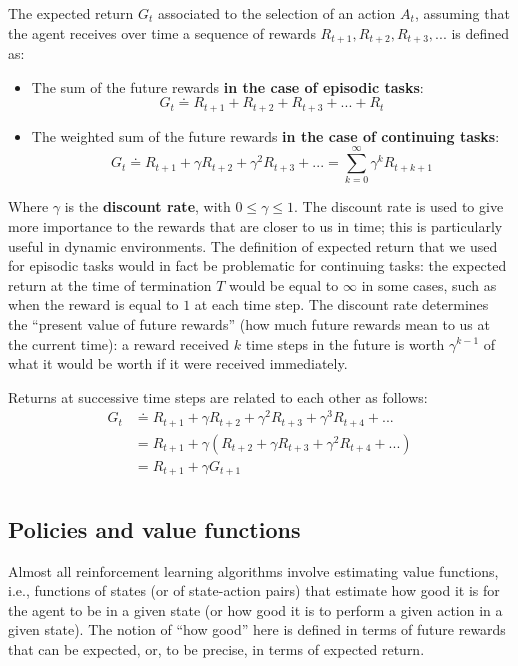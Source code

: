 The expected return $G_t$ associated to the selection of an action $A_t$, assuming that the agent receives over time a sequence of rewards $R_{t+1}, R_{t+2}, R_{t+3}, ...$ is defined as:
\begin{itemize}
    \item The sum of the future rewards \textbf{in the case of episodic tasks}:
    \begin{equation}
        G_t \doteq R_{t+1} + R_{t+2} + R_{t+3} + ... + R_t
        \label{eq:ch2-expectedreturn-episodic}
    \end{equation}
    \item The weighted sum of the future rewards \textbf{in the case of continuing tasks}:
    \begin{equation}
        G_t \doteq R_{t+1} + \gamma R_{t+2} + \gamma^2 R_{t+3} + ... = \sum_{k=0}^{\infty} \gamma^k R_{t+k+1}
        \label{eq:ch2-expectedreturn-continuous}
    \end{equation}
\end{itemize}

Where $\gamma$ is the \textbf{discount rate}, with $0 \le \gamma \le 1$. The discount rate is used to give more importance to the rewards that are closer to us in time; this is particularly useful in dynamic environments. The definition of expected return that we used for episodic tasks would in fact be problematic for continuing tasks: the expected return at the time of termination $T$ would be equal to $\infty$ in some cases, such as when the reward is equal to $1$ at each time step. The discount rate determines the ``present value of future rewards'' (how much future rewards mean to us at the current time): a reward received $k$ time steps in the future is worth $\gamma^{k-1}$ of what it would be worth if it were received immediately.

Returns at successive time steps are related to each other as follows:
\begin{equation*}
    \begin{split}
        G_t & \doteq R_{t+1} + \gamma R_{t+2} + \gamma^2 R_{t+3} + \gamma^3 R_{t+4} + ... \\
        & = R_{t+1} + \gamma \left( R_{t+2} + \gamma R_{t+3} + \gamma^2 R_{t+4} + ... \right) \\
        & = R_{t+1} + \gamma G_{t+1} \\
    \end{split}
\end{equation*}

\subsection{Policies and value functions}
Almost all reinforcement learning algorithms involve estimating value functions, i.e., functions of states (or of state-action pairs) that estimate how good it is for the agent to be in a given state (or how good it is to perform a given action in a given state). The notion of ``how good'' here is defined in terms of future rewards that can be expected, or, to be precise, in terms of expected return.

